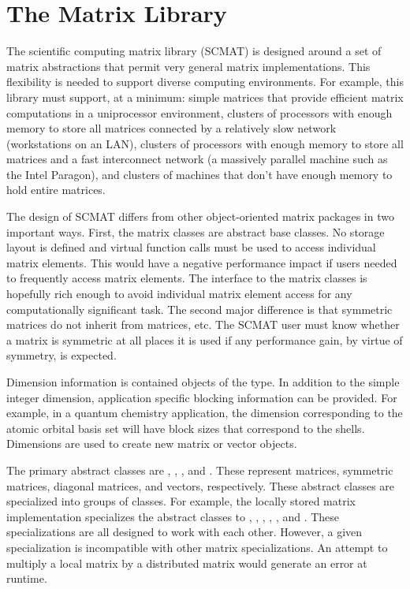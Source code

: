 
\chapter{The Matrix Library}

The scientific computing matrix library (SCMAT) is designed around a set
of matrix abstractions that permit very general matrix implementations.
This flexibility is needed to support diverse computing environments.
For example, this library must support, at a minimum: simple matrices
that provide efficient matrix computations in a uniprocessor
environment, clusters of processors with enough memory to store all
matrices connected by a relatively slow network (workstations on an
LAN), clusters of processors with enough memory to store all matrices
and a fast interconnect network (a massively parallel machine such as
the Intel Paragon), and clusters of machines that don't have enough
memory to hold entire matrices.

The design of SCMAT differs from other object-oriented matrix packages
in two important ways.  First, the matrix classes are abstract base
classes.  No storage layout is defined and virtual function calls must
be used to access individual matrix elements.  This would have a
negative performance impact if users needed to frequently access matrix
elements.  The interface to the matrix classes is hopefully rich enough
to avoid individual matrix element access for any computationally
significant task.  The second major difference is that symmetric
matrices do not inherit from matrices, etc.  The SCMAT user must know
whether a matrix is symmetric at all places it is used if any
performance gain, by virtue of symmetry, is expected.

Dimension information is contained objects of the 
type.  In addition to the simple integer dimension, application specific
blocking information can be provided.  For example, in a quantum chemistry
application, the dimension corresponding to the atomic orbital basis set
will have block sizes that correspond to the shells.  Dimensions are used
to create new matrix or vector objects.

The primary abstract classes are ,
, , and .
These represent matrices, symmetric matrices, diagonal matrices, and
vectors, respectively.  These abstract classes are specialized into groups
of classes.  For example, the locally stored matrix implementation
specializes the abstract classes to ,
, ,
, , and
.  These specializations are all designed to
work with each other.  However, a given specialization is incompatible with
other matrix specializations.  An attempt to multiply a local matrix by a
distributed matrix would generate an error at runtime.

